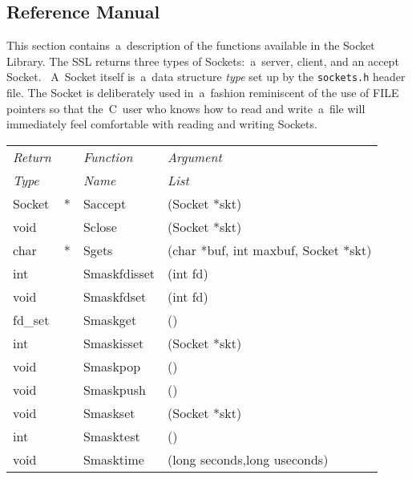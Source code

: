 \documentclass[12pt]{article}
\def\SSL{{\small SSL}}
\begin{document}
\subsection{Reference Manual}

This section contains~a~description of the functions available in the Socket
Library.  The {\SSL} returns three types of Sockets:~a~server, client, and an
accept Socket. ~A~Socket itself is~a~data structure {\em type} set up by the
\verb`sockets.h` header file.  The Socket is deliberately used in~a~fashion
reminiscent of the use of {\small FILE} pointers so that the~C~user who knows
how to read and write~a~file will immediately feel comfortable with reading and
writing Sockets.

\begin{center}
  \begin{tabular}{||ll|l|l||} \hline\hline
  {\em Return}  &   & {\em Function} & {\em Argument}                           \\
  {\em Type}    &   & {\em Name}     & {\em List}                               \\
  \hline
  Socket        & * & Saccept        & (Socket *skt)                            \\
  void          &   & Sclose         & (Socket *skt)                            \\
  char          & * & Sgets          & (char *buf, int maxbuf, Socket *skt)     \\
  int           &   & Smaskfdisset   & (int fd)                                 \\
  void          &   & Smaskfdset     & (int fd)                                 \\
  fd\_set       &   & Smaskget       & ()                                       \\
  int           &   & Smaskisset     & (Socket *skt)                            \\
  void          &   & Smaskpop       & ()                                       \\
  void          &   & Smaskpush      & ()                                       \\
  void          &   & Smaskset       & (Socket *skt)                            \\
  int           &   & Smasktest      & ()                                       \\
  void          &   & Smasktime      & (long seconds,long useconds)             \\

\end{tabular}
\end{center}
\end{document}
